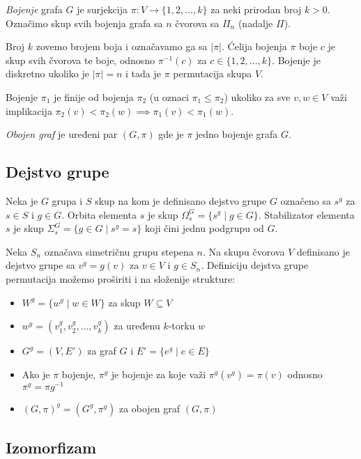 \documentclass[12pt,oneside]{memoir}
\theoremstyle{definition}
\begin{document}
   \emph{Bojenje} grafa $G$ je surjekcija $\pi : V \to \{1, 2, \dots, k\}$ za
   neki prirodan broj $k > 0$. Označimo skup svih bojenja grafa sa $n$ čvorova
   sa $\Pi_n$ (nadalje $\Pi$).

   Broj $k$ zovemo brojem boja i označavamo ga sa $|\pi|$.  Ćelija bojenja $\pi$
   boje $c$ je skup svih čvorova te boje, odnosno $\pi^{-1}(c)$ za $c \in \{1,
   2, ..., k\}$.  Bojenje je diskretno ukoliko je $|\pi| = n$ i tada je $\pi$
   permutacija skupa $V$.

   Bojenje $\pi_1$ je finije od bojenja $\pi_2$ (u oznaci $\pi_1 \leq \pi_2$)
   ukoliko za sve $v, w \in V$ važi implikacija $\pi_2(v) < \pi_2(w) \implies
   \pi_1(v) < \pi_1(w)$.

   \emph{Obojen graf} je uređeni par $(G, \pi)$ gde je $\pi$ jedno bojenje
   grafa $G$.


   \subsection{Dejstvo grupe}

   Neka je $G$ grupa i $S$ skup na kom je definisano dejstvo grupe $G$ označeno
   sa $s^g$ za $s \in S$ i $g \in G$. Orbita elementa $s$ je skup $\Omega_s^G =
   \{s^g \mid g \in G\}$.  Stabilizator elementa $s$ je skup $\Sigma_s^G = \{g
   \in G \mid s^g=s\}$ koji čini jednu podgrupu od $G$.

   Neka $S_n$ označava simetričnu grupu stepena $n$. Na skupu čvorova $V$
   definisano je dejstvo grupe sa $v^g = g(v)$ za $v \in V$ i $g \in S_n$.
   Definiciju dejstva grupe permutacija možemo proširiti i na složenije
   strukture:
   \begin{itemize}
       \item $W^g = \{w^g \mid w \in W\}$ za skup $W \subseteq V$
       \item $w^g = (v_1^g, v_2^g, \dots, v_k^g)$ za uređenu $k$-torku $w$
       \item $G^g = (V, E')$ za graf $G$ i $E' = \{e^g \mid e \in E\}$
       \item Ako je $\pi$ bojenje, $\pi^g$ je bojenje za koje važi
		   $\pi^g(v^g)=\pi(v)$ odnosno $\pi^g=\pi g^{-1}$
       \item $(G, \pi)^g = (G^g, \pi^g)$ za obojen graf $(G, \pi)$
   \end{itemize}


   \subsection{Izomorfizam}
\end{document}

